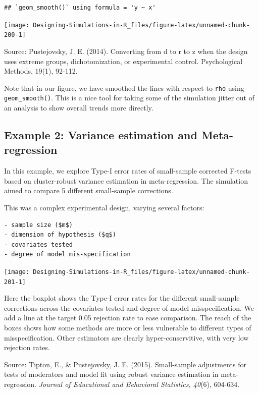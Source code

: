\documentclass[
]{book}
\begin{document}
\begin{verbatim}
## `geom_smooth()` using formula = 'y ~ x'
\end{verbatim}

\begin{center}\texttt{[image: Designing-Simulations-in-R\_files/figure-latex/unnamed-chunk-200-1]} \end{center}

Source: Pustejovsky, J. E. (2014). Converting from d to r to z when the design uses extreme groups, dichotomization, or experimental control. Psychological Methods, 19(1), 92-112.

Note that in our figure, we have smoothed the lines with respect to \texttt{rho} using \texttt{geom\_smooth()}.
This is a nice tool for taking some of the simulation jitter out of an analysis to show overall trends more directly.

\subsection{Example 2: Variance estimation and Meta-regression}\label{example-2-variance-estimation-and-meta-regression}

In this example, we explore Type-I error rates of small-sample corrected F-tests based on cluster-robust variance estimation in meta-regression.
The simulation aimed to compare 5 different small-sample corrections.

This was a complex experimental design, varying several factors:

\begin{verbatim}
- sample size ($m$)
- dimension of hypothesis ($q$)
- covariates tested
- degree of model mis-specification
\end{verbatim}

\begin{center}\texttt{[image: Designing-Simulations-in-R\_files/figure-latex/unnamed-chunk-201-1]} \end{center}

Here the boxplot shows the Type-I error rates for the different small-sample corrections across the covariates tested and degree of model misspecification. We add a line at the target 0.05 rejection rate to ease comparison.
The reach of the boxes shows how some methods are more or less vulnerable to different types of misspecification. Other estimators are clearly hyper-conservitive, with very low rejection rates.

Source: Tipton, E., \& Pustejovsky, J. E. (2015). Small-sample adjustments for tests of moderators and model fit using robust variance estimation in meta-regression. \emph{Journal of Educational and Behavioral Statistics, 40}(6), 604-634.
\end{document}
